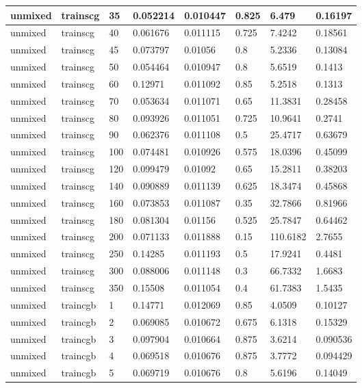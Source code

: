 \begin{longtable}{llllllll}
unmixed & trainscg & 35 & 0.052214 & 0.010447 & 0.825 & 6.479 & 0.16197 \\ \hline 
unmixed & trainscg & 40 & 0.061676 & 0.011115 & 0.725 & 7.4242 & 0.18561 \\ \hline 
unmixed & trainscg & 45 & 0.073797 & 0.01056 & 0.8 & 5.2336 & 0.13084 \\ \hline 
unmixed & trainscg & 50 & 0.054464 & 0.010947 & 0.8 & 5.6519 & 0.1413 \\ \hline 
unmixed & trainscg & 60 & 0.12971 & 0.011092 & 0.85 & 5.2518 & 0.1313 \\ \hline 
unmixed & trainscg & 70 & 0.053634 & 0.011071 & 0.65 & 11.3831 & 0.28458 \\ \hline 
unmixed & trainscg & 80 & 0.093926 & 0.011051 & 0.725 & 10.9641 & 0.2741 \\ \hline 
unmixed & trainscg & 90 & 0.062376 & 0.011108 & 0.5 & 25.4717 & 0.63679 \\ \hline 
unmixed & trainscg & 100 & 0.074481 & 0.010926 & 0.575 & 18.0396 & 0.45099 \\ \hline 
unmixed & trainscg & 120 & 0.099479 & 0.01092 & 0.65 & 15.2811 & 0.38203 \\ \hline 
unmixed & trainscg & 140 & 0.090889 & 0.011139 & 0.625 & 18.3474 & 0.45868 \\ \hline 
unmixed & trainscg & 160 & 0.073853 & 0.011087 & 0.35 & 32.7866 & 0.81966 \\ \hline 
unmixed & trainscg & 180 & 0.081304 & 0.01156 & 0.525 & 25.7847 & 0.64462 \\ \hline 
unmixed & trainscg & 200 & 0.071133 & 0.011888 & 0.15 & 110.6182 & 2.7655 \\ \hline 
unmixed & trainscg & 250 & 0.14285 & 0.011193 & 0.5 & 17.9241 & 0.4481 \\ \hline 
unmixed & trainscg & 300 & 0.088006 & 0.011148 & 0.3 & 66.7332 & 1.6683 \\ \hline 
unmixed & trainscg & 350 & 0.15508 & 0.011054 & 0.4 & 61.7383 & 1.5435 \\ \hline 
unmixed & traincgb & 1 & 0.14771 & 0.012069 & 0.85 & 4.0509 & 0.10127 \\ \hline 
unmixed & traincgb & 2 & 0.069085 & 0.010672 & 0.675 & 6.1318 & 0.15329 \\ \hline 
unmixed & traincgb & 3 & 0.097904 & 0.010664 & 0.875 & 3.6214 & 0.090536 \\ \hline 
unmixed & traincgb & 4 & 0.069518 & 0.010676 & 0.875 & 3.7772 & 0.094429 \\ \hline 
unmixed & traincgb & 5 & 0.069719 & 0.010676 & 0.8 & 5.6196 & 0.14049 \\ \hline 

\end{longtable}

